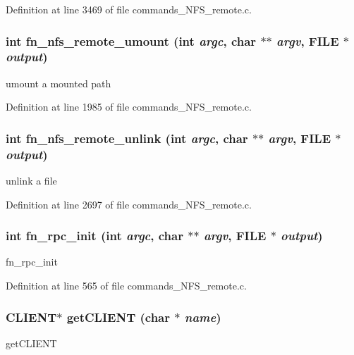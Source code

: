 Definition at line 3469 of file commands\_\-NFS\_\-remote.c.
\subsubsection[{fn\_\-nfs\_\-remote\_\-umount}]{\setlength{\rightskip}{0pt plus 5cm}int fn\_\-nfs\_\-remote\_\-umount (int {\em argc}, \/  char $\ast$$\ast$ {\em argv}, \/  FILE $\ast$ {\em output})}\label{commands__NFS__remote_8c_a70c8c0f939759e036b0dd786623f942c}
umount a mounted path 

Definition at line 1985 of file commands\_\-NFS\_\-remote.c.
\subsubsection[{fn\_\-nfs\_\-remote\_\-unlink}]{\setlength{\rightskip}{0pt plus 5cm}int fn\_\-nfs\_\-remote\_\-unlink (int {\em argc}, \/  char $\ast$$\ast$ {\em argv}, \/  FILE $\ast$ {\em output})}\label{commands__NFS__remote_8c_ae7889c63ec94ea9fabfe222ef77f734f}
unlink a file 

Definition at line 2697 of file commands\_\-NFS\_\-remote.c.
\subsubsection[{fn\_\-rpc\_\-init}]{\setlength{\rightskip}{0pt plus 5cm}int fn\_\-rpc\_\-init (int {\em argc}, \/  char $\ast$$\ast$ {\em argv}, \/  FILE $\ast$ {\em output})}\label{commands__NFS__remote_8c_a4e73bacfb224496a2393bbc05ced1d76}
fn\_\-rpc\_\-init 

Definition at line 565 of file commands\_\-NFS\_\-remote.c.
\subsubsection[{getCLIENT}]{\setlength{\rightskip}{0pt plus 5cm}CLIENT$\ast$ getCLIENT (char $\ast$ {\em name})}\label{commands__NFS__remote_8c_a31a2d10d287ce85cad60a6731d5630f2}
getCLIENT 

